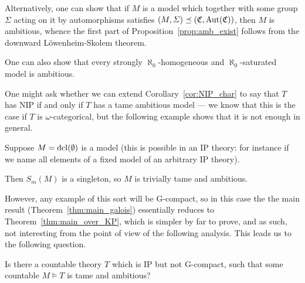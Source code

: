 	\begin{rem}
		Alternatively, one can show that if $M$ is a model which together with some group $\Sigma$ acting on it by automorphisms satisfies $(M,\Sigma)\preceq ({\mathfrak C},\operatorname{{Aut}}({\mathfrak C}))$, then $M$ is ambitious, whence the first part of Proposition~\ref{prop:amb_exist} follows from the downward Löwenheim-Skolem theorem.
		\xqed{\lozenge}
	\end{rem}
	
	\begin{rem}
		One can also show that every strongly $\aleph_0$-homogeneous and $\aleph_0$-saturated model is ambitious.\xqed{\lozenge}
	\end{rem}
	
	
	One might ask whether we can extend Corollary~\ref{cor:NIP_char} to say that $T$ has NIP if and only if $T$ has a tame ambitious model --- we know that this is the case if $T$ is $\omega$-categorical, but the following example shows that it is not enough in general.
	
	\begin{ex}
		Suppose $M=\operatorname{{dcl}}(\emptyset)$ is a model (this is possible in an IP theory: for instance if we name all elements of a fixed model of an arbitrary IP theory).
		
		Then $S_{m}(M)$ is a singleton, so $M$ is trivially tame and ambitious.\xqed{\lozenge}
	\end{ex}
	However, any example of this sort will be G-compact, so in this case the the main result (Theorem~\ref{thm:main_galois}) essentially reduces to Theorem~\ref{thm:main_over_KP}, which is simpler by far to prove, and as such, not interesting from the point of view of the following analysis. This leads us to the following question.
	\begin{ques}
		\label{ques:non-g-cpct_tame}
		Is there a countable theory $T$ which is IP but not G-compact, such that some countable $M\models T$ is tame and ambitious?
		\xqed{\lozenge}
	\end{ques}
	
